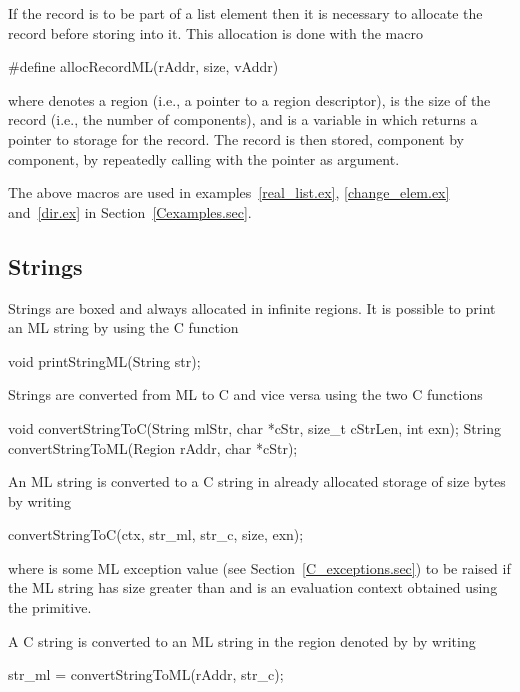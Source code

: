 \documentclass[12pt]{book}
\begin{document}
If the record is to be part of a list element then it is necessary to allocate
the record before storing into it. This allocation is done with the macro
%
%
%
\begin{scriptcode}
  #define allocRecordML(rAddr, size, vAddr)
\end{scriptcode}
where  denotes a region (i.e., a pointer to a region descriptor),
 is the size of the record (i.e., the number of components), and
 is a variable in which  returns a pointer to
storage for the record. The record is then stored, component by component, by
repeatedly calling  with the pointer  as argument.

The above macros are used in examples~\ref{real_list.ex}, \ref{change_elem.ex}
and~\ref{dir.ex} in Section~\ref{Cexamples.sec}.

\subsection{Strings}
Strings are boxed and always allocated in infinite regions. It is possible to
print an ML string by using the C function
%
%
%
\begin{scriptcode}
  void printStringML(String str);
\end{scriptcode}

Strings are converted from ML to C and vice versa using the two C functions
%
%
%
%
\begin{scriptcode}
  void convertStringToC(String mlStr, char *cStr,
                        size_t cStrLen, int exn);
  String convertStringToML(Region rAddr, char *cStr);
\end{scriptcode}
An ML string  is converted to a C string  in already
allocated storage of size  bytes by writing
\begin{scriptcode}
  convertStringToC(ctx, str_ml, str_c, size, exn);
\end{scriptcode}
where  is some ML exception value (see Section~\ref{C_exceptions.sec})
to be raised if the ML string has size greater than  and  is an
evaluation context obtained using the  primitive.

A C string is converted to an ML string in the region denoted by  by
writing
\begin{scriptcode}
  str_ml = convertStringToML(rAddr, str_c);
\end{scriptcode}
\end{document}

